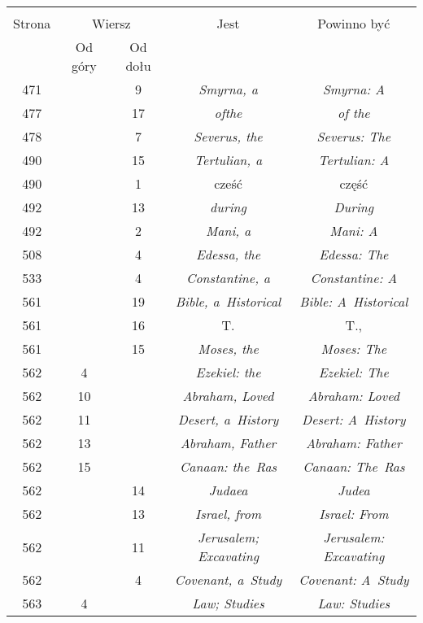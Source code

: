 \documentclass[a4paper,11pt]{article}
\begin{document}
\begin{center}
  \begin{tabular}{|c|c|c|c|c|}
    \hline
    & \multicolumn{2}{c|}{} & & \\
    Strona & \multicolumn{2}{c|}{Wiersz} & Jest
                              & Powinno być \\ \cline{2-3}
    & Od góry & Od dołu & & \\
    \hline
    471 & &  9 & \textit{Smyrna, a} & \textit{Smyrna: A} \\
    477 & & 17 & \textit{ofthe} & \textit{of the} \\
    478 & &  7 & \textit{Severus, the} & \textit{Severus: The} \\
    490 & & 15 & \textit{Tertulian, a} & \textit{Tertulian: A} \\
    490 & &  1 & cześć & część \\
    492 & & 13 & \textit{during} & \textit{During} \\
    492 & &  2 & \textit{Mani, a} & \textit{Mani: A} \\
    508 & &  4 & \textit{Edessa, the} & \textit{Edessa: The} \\
    533 & &  4 & \textit{Constantine, a} & \textit{Constantine: A} \\
    561 & & 19 & \textit{Bible, a~Historical}
           & \textit{Bible: A~Historical} \\
    561 & & 16 & T. & T., \\
    561 & & 15 & \textit{Moses, the} & \textit{Moses: The} \\
    562 &  4 & & \textit{Ezekiel: the} & \textit{Ezekiel: The} \\
    562 & 10 & & \textit{Abraham, Loved} & \textit{Abraham: Loved} \\
    562 & 11 & & \textit{Desert, a~History} & \textit{Desert: A~History} \\
    562 & 13 & & \textit{Abraham, Father} & \textit{Abraham: Father} \\
    562 & 15 & & \textit{Canaan: the~Ras} & \textit{Canaan: The~Ras} \\
    562 & & 14 & \textit{Judaea} & \textit{Judea} \\
    562 & & 13 & \textit{Israel, from} & \textit{Israel: From} \\
    562 & & 11 & \textit{Jerusalem; Excavating}
           & \textit{Jerusalem: Excavating} \\
    562 & &  4 & \textit{Covenant, a~Study} & \textit{Covenant: A~Study} \\
    563 &  4 & & \textit{Law; Studies} & \textit{Law: Studies} \\

\end{tabular}
\end{center}
\end{document}
